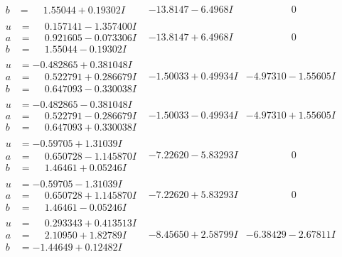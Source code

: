 \documentclass[1p]{elsarticle_modified}
\theoremstyle{definition}
\begin{document}
$$\begin{array}{c|c|c}
\begin{aligned}
b &= \phantom{-}1.55044 + 0.19302 I\end{aligned}
 & -13.8147 - 6.4968 I & \phantom{-0.000000 } 0 \\ \hline\begin{aligned}
u &= \phantom{-}0.157141 - 1.357400 I \\
a &= \phantom{-}0.921605 - 0.073306 I \\
b &= \phantom{-}1.55044 - 0.19302 I\end{aligned}
 & -13.8147 + 6.4968 I & \phantom{-0.000000 } 0 \\ \hline\begin{aligned}
u &= -0.482865 + 0.381048 I \\
a &= \phantom{-}0.522791 + 0.286679 I \\
b &= \phantom{-}0.647093 - 0.330038 I\end{aligned}
 & -1.50033 + 0.49934 I & -4.97310 - 1.55605 I \\ \hline\begin{aligned}
u &= -0.482865 - 0.381048 I \\
a &= \phantom{-}0.522791 - 0.286679 I \\
b &= \phantom{-}0.647093 + 0.330038 I\end{aligned}
 & -1.50033 - 0.49934 I & -4.97310 + 1.55605 I \\ \hline\begin{aligned}
u &= -0.59705 + 1.31039 I \\
a &= \phantom{-}0.650728 - 1.145870 I \\
b &= \phantom{-}1.46461 + 0.05246 I\end{aligned}
 & -7.22620 - 5.83293 I & \phantom{-0.000000 } 0 \\ \hline\begin{aligned}
u &= -0.59705 - 1.31039 I \\
a &= \phantom{-}0.650728 + 1.145870 I \\
b &= \phantom{-}1.46461 - 0.05246 I\end{aligned}
 & -7.22620 + 5.83293 I & \phantom{-0.000000 } 0 \\ \hline\begin{aligned}
u &= \phantom{-}0.293343 + 0.413513 I \\
a &= \phantom{-}2.10950 + 1.82789 I \\
b &= -1.44649 + 0.12482 I\end{aligned}
 & -8.45650 + 2.58799 I & -6.38429 - 2.67811 I \\ \hline\begin{aligned}

\end{aligned}
\end{array}$$
\end{document}

